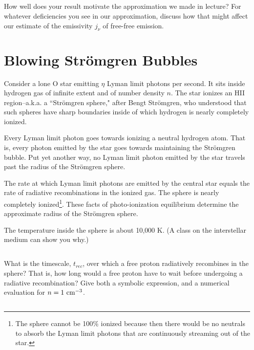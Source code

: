 \documentclass[11pt]{article}
\def\trec{{t_{rec}}}
\begin{document}
\subsection{}
How well does your result motivate the approximation we made in lecture?  For whatever deficiencies you see in our approximation,
discuss how that might affect our estimate of the emissivity $j_\nu$ of free-free emission.

\section{Blowing Str\"omgren Bubbles}\label{p2}

Consider a lone O star emitting $\eta$ Lyman limit photons per second. It sits
inside hydrogen gas of infinite extent and of number density $n$. The star
ionizes an HII region--a.k.a. a ``Str\"omgren sphere," after Bengt Str\"omgren, who
understood that such spheres have sharp boundaries inside of which hydrogen is nearly
completely ionized.

Every Lyman limit photon goes towards ionizing a neutral hydrogen atom. That
is, every photon emitted by the star goes towards maintaining the Str\"omgren
bubble. Put yet another way, no Lyman limit photon emitted by the star travels
past the radius of the Str\"omgren sphere.

The rate at which Lyman limit photons are emitted by the central star equals
the rate of radiative recombinations in the ionized gas. The sphere is nearly
completely ionized\footnote{The
sphere cannot be 100\% ionized because then there would be no neutrals to
absorb the Lyman limit photons that are continuously streaming out of the star.}.
These facts of photo-ionization equilibrium determine the
approximate radius of the Str\"omgren sphere.

The temperature inside the sphere is about 10,000 K. (A class on the interstellar medium can show you why.)

\subsection{}\label{p2partb}

What is the timescale, $\trec$, over which a free proton radiatively recombines in
the sphere? That is, how long would a free proton have to wait before
undergoing a radiative recombination? Give both a symbolic expression, and a
numerical evaluation for $n = 1~{\rm cm}^{-3}$.

\subsection{}
\end{document}
